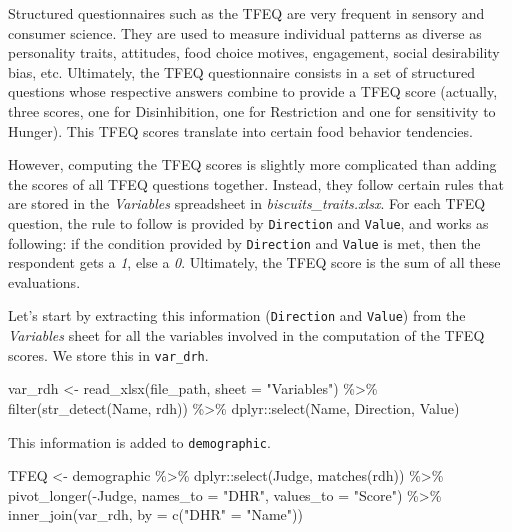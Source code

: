 \documentclass[
]{krantz}
\makeatletter
\newenvironment{Shaded}{\begin{snugshade}}{\end{snugshade}}
\newcommand{\AttributeTok}[1]{\textcolor[rgb]{0.61,0.61,0.61}{#1}}
\newcommand{\FunctionTok}[1]{\textcolor[rgb]{0,0,0}{#1}}
\newcommand{\NormalTok}[1]{#1}
\newcommand{\OtherTok}[1]{\textcolor[rgb]{0.37,0.37,0.37}{#1}}
\newcommand{\SpecialCharTok}[1]{\textcolor[rgb]{0,0,0}{#1}}
\newcommand{\StringTok}[1]{\textcolor[rgb]{0.5,0.5,0.5}{#1}}
\newenvironment{kframe}{%
\medskip{}
\setlength{\fboxsep}{.8em}
 \def\at@end@of@kframe{}%
 \ifinner\ifhmode%
  \def\at@end@of@kframe{\end{minipage}}%
  \begin{minipage}{\columnwidth}%
 \fi\fi%
 \def\FrameCommand##1{\hskip\@totalleftmargin \hskip-\fboxsep
 \colorbox{shadecolor}{##1}\hskip-\fboxsep
     \hskip-\linewidth \hskip-\@totalleftmargin \hskip\columnwidth}%
 \MakeFramed {\advance\hsize-\width
   \@totalleftmargin\z@ \linewidth\hsize
   \@setminipage}}%
 {\par\unskip\endMakeFramed%
 \at@end@of@kframe}
\renewenvironment{Shaded}{\begin{kframe}}{\end{kframe}}
\makeatother
\begin{document}
Structured questionnaires such as the TFEQ are very frequent in sensory and consumer science. They are used to measure individual patterns as diverse as personality traits, attitudes, food choice motives, engagement, social desirability bias, etc. Ultimately, the TFEQ questionnaire consists in a set of structured questions whose respective answers combine to provide a TFEQ score (actually, three scores, one for Disinhibition, one for Restriction and one for sensitivity to Hunger). This TFEQ scores translate into certain food behavior tendencies.

However, computing the TFEQ scores is slightly more complicated than adding the scores of all TFEQ questions together. Instead, they follow certain rules that are stored in the \emph{Variables} spreadsheet in \emph{biscuits\_traits.xlsx}. For each TFEQ question, the rule to follow is provided by \texttt{Direction} and \texttt{Value}, and works as following: if the condition provided by \texttt{Direction} and \texttt{Value} is met, then the respondent gets a \emph{1}, else a \emph{0}. Ultimately, the TFEQ score is the sum of all these evaluations.

Let's start by extracting this information (\texttt{Direction} and \texttt{Value}) from the \emph{Variables} sheet for all the variables involved in the computation of the TFEQ scores. We store this in \texttt{var\_drh}.

\begin{Shaded}
\begin{Highlighting}[]
\NormalTok{var\_rdh }\OtherTok{\textless{}{-}} \FunctionTok{read\_xlsx}\NormalTok{(file\_path, }\AttributeTok{sheet =} \StringTok{"Variables"}\NormalTok{) }\SpecialCharTok{\%\textgreater{}\%}
  \FunctionTok{filter}\NormalTok{(}\FunctionTok{str\_detect}\NormalTok{(Name, rdh)) }\SpecialCharTok{\%\textgreater{}\%}
\NormalTok{  dplyr}\SpecialCharTok{::}\FunctionTok{select}\NormalTok{(Name, Direction, Value)}
\end{Highlighting}
\end{Shaded}

This information is added to \texttt{demographic}.

\begin{Shaded}
\begin{Highlighting}[]
\NormalTok{TFEQ }\OtherTok{\textless{}{-}}\NormalTok{ demographic }\SpecialCharTok{\%\textgreater{}\%}
\NormalTok{  dplyr}\SpecialCharTok{::}\FunctionTok{select}\NormalTok{(Judge, }\FunctionTok{matches}\NormalTok{(rdh)) }\SpecialCharTok{\%\textgreater{}\%}
  \FunctionTok{pivot\_longer}\NormalTok{(}\SpecialCharTok{{-}}\NormalTok{Judge, }\AttributeTok{names\_to =} \StringTok{"DHR"}\NormalTok{, }\AttributeTok{values\_to =} \StringTok{"Score"}\NormalTok{) }\SpecialCharTok{\%\textgreater{}\%}
  \FunctionTok{inner\_join}\NormalTok{(var\_rdh, }\AttributeTok{by =} \FunctionTok{c}\NormalTok{(}\StringTok{"DHR"} \OtherTok{=} \StringTok{"Name"}\NormalTok{))}
\end{Highlighting}
\end{Shaded}
\end{document}
